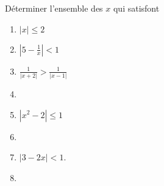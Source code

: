 

\begin{exercice}\label{exoSerieUn0006}

	Déterminer l'ensemble des $x$ qui satisfont
	\begin{enumerate}

		\item
			$| x |\leq 2$
		\item
			$\left| 5-\frac{1}{ x } \right| <1$
		\item
			$\frac{1}{ | x+2 | }>\frac{1}{ | x-1 | }$
		\item

		\item
			$| x^2-2 |\leq 1$
		\item
			
		\item
			$| 3-2x |<1$.

		\item

	\end{enumerate}

\end{exercice}
